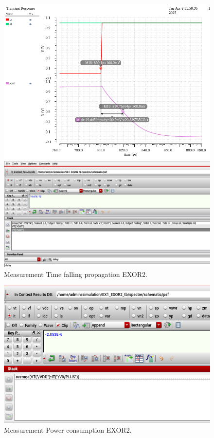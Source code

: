 \begin{figure}[H]
	\begin{minipage}{0.5\linewidth}
		\includegraphics[width=\linewidth]{section/EX1/EXOR/EX1_EXOR2_Tpdf_Waveform.png}
	\end{minipage}
	\begin{minipage}{0.5\linewidth}
		\includegraphics[width=\linewidth]{section/EX1/EXOR/EX1_EXOR2_Tpdf_Cal.png}
	\end{minipage}
	\caption{Measurement Time falling propagation EXOR2.}
\end{figure}

\begin{figure}[H]
	\centering
	\includegraphics[width=.7\linewidth]{section/EX1/EXOR/EX1_EXOR2_Power.png}
	\caption{Measurement Power consumption EXOR2.}
\end{figure}

